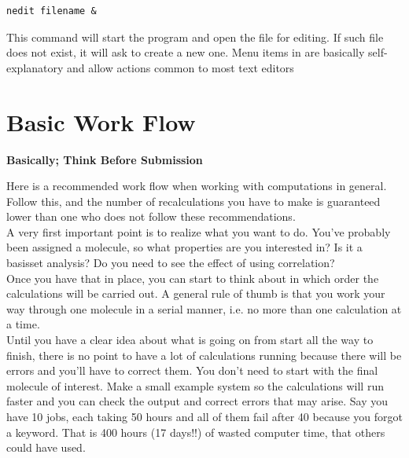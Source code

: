 \documentclass{article}
\begin{document}
\begin{lstlisting}
nedit filename &
\end{lstlisting}

This command will start the program  and open the file  for editing. If such file does not exist, it will ask to create a new one.
Menu items in  are basically self-explanatory and allow actions common to most text editors

\newpage
\section{Basic Work Flow}

\begin{center}
\bf Basically; Think Before Submission
\end{center}



Here is a recommended work flow when working with computations in general.
Follow this, and the number of recalculations you have to make is guaranteed lower than one who does not follow these recommendations.\\

A very first important point is to realize what you want to do.
You've probably been assigned a molecule, so what properties are you interested in?
Is it a basisset analysis?
Do you need to see the effect of using correlation?\\

Once you have that in place, you can start to think about in which order the calculations will be carried out.
A general rule of thumb is that you work your way through one molecule in a serial manner, i.e. no more than one calculation at a time.\\

Until you have a clear idea about what is going on from start all the way to finish, there is no point to have a lot of calculations running because there will be errors and you'll have to correct them.
You don't need to start with the final molecule of interest.
Make a small example system so the calculations will run faster and you can check the output and correct errors that may arise.
Say you have 10 jobs, each taking 50 hours and all of them fail after 40 because you forgot a keyword.
That is 400 hours (17 days!!) of wasted computer time, that others could have used.\\
\end{document}
